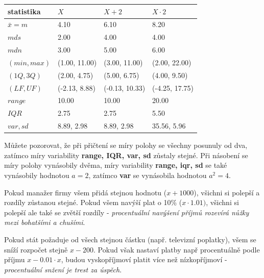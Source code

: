\documentclass[
  czech,
  11pt,
  letterpaper,
  DIV=11,
  numbers=noendperiod]{scrreprt}
\newcounter{none} %
\begin{document}
{\def\LTcaptype{none} %
\begin{longtable}[]{@{}llll@{}}
\toprule\noalign{}
statistika & \(X\) & \(X+2\) & \(X\cdot 2\) \\
\midrule\noalign{}
\endhead
\bottomrule\noalign{}
\endlastfoot
\(\bar{x}=m\) & 4.10 & 6.10 & 8.20 \\
\(mds\) & 2.00 & 4.00 & 4.00 \\
\(mdn\) & 3.00 & 5.00 & 6.00 \\
\((min, max)\) & (1.00, 11.00) & (3.00, 11.00) & (2.00, 22.00) \\
\((1Q, 3Q)\) & (2.00, 4.75) & (5.00, 6.75) & (4.00, 9.50) \\
\((LF, UF)\) & (-2.13, 8.88) & (-0.13, 10.33) & (-4.25, 17.75) \\
\(range\) & 10.00 & 10.00 & 20.00 \\
\(IQR\) & 2.75 & 2.75 & 5.50 \\
\(var, sd\) & 8.89, 2.98 & 8.89, 2.98 & 35.56, 5.96 \\
\end{longtable}
}

Můžete pozorovat, že při přičtení se míry polohy se všechny posunuly od
dva, zatímco míry variability \textbf{range, IQR, var, sd} zůstaly
stejné. Při násobení se míry polohy vynásobily dvěma, míry variability
\textbf{range, iqr, sd} se také vynásobily hodnotou \(a=2\), zatímco
\textbf{var} se vynásobila hodnotou \(a^2=4\).

\begin{tcolorbox}[enhanced jigsaw, arc=.35mm, bottomrule=.15mm, bottomtitle=1mm, breakable, colback=white, colbacktitle=quarto-callout-note-color!10!white, colframe=quarto-callout-note-color-frame, coltitle=black, left=2mm, leftrule=.75mm, opacityback=0, opacitybacktitle=0.6, rightrule=.15mm, title=\textcolor{quarto-callout-note-color}{\faInfo}\hspace{0.5em}{Poznámka}, titlerule=0mm, toprule=.15mm, toptitle=1mm]

Pokud manažer firmy všem přidá stejnou hodnotu (\(x+1000\)), všichni si
polepší a rozdíly zůstanou stejné. Pokud všem navýší plat o 10\%
(\(x\cdot 1.01)\), všichni si polepší ale také se zvětší rozdíly -
\emph{procentuální navýšení příjmů rozevírá nůžky mezi bohatšími a
chušími}.

Pokud stát požaduje od všech stejnou částku (např. televizní poplatky),
všem se sníží rozpočet stejně \(x-200\). Pokud však nastaví platby např
procentuálně podle příjmu \(x-0.01\cdot x\), budou vyskopříjmoví platit
více než nízkopříjmoví - \emph{procentuální snžení je trest za úspěch}.

\end{tcolorbox}
\end{document}
